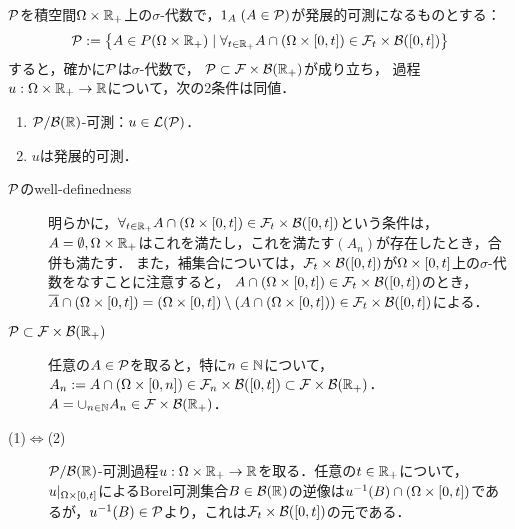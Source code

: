 \documentclass[uplatex,dvipdfmx]{jsreport}
\begin{document}
\begin{lemma}[発展的可測性の特徴付け]
    $\P$を積空間$\Om\times\R_+$上の$\sigma$-代数で，$1_A\;(A\in\P)$が発展的可測になるものとする：
    \[\P:=\Brace{A\in P(\Om\times\R_+)\mid\forall_{t\in\R_+} A\cap(\Om\times[0,t])\in\F_t\times\B([0,t])}\]
    すると，確かに$\P$は$\sigma$-代数で，
    $\P\subset\F\times\B(\R_+)$が成り立ち，
    過程$u:\Om\times\R_+\to\R$について，次の2条件は同値．
    \begin{enumerate}
        \item $\P/\B(\R)$-可測：$u\in\L(\P)$．
        \item $u$は発展的可測．
    \end{enumerate}
\end{lemma}
\begin{Proof}\mbox{}
    \begin{description}
        \item[$\P$のwell-definedness] 明らかに，$\forall_{t\in\R_+} A\cap(\Om\times[0,t])\in\F_t\times\B([0,t])$という条件は，$A=\emptyset,\Om\times\R_+$はこれを満たし，これを満たす$(A_n)$が存在したとき，合併も満たす．
        また，補集合については，$\F_t\times\B([0,t])$が$\Om\times[0,t]$上の$\sigma$-代数をなすことに注意すると，
        $A\cap(\Om\times[0,t])\in\F_t\times\B([0,t])$のとき，
        $\o{A}\cap(\Om\times[0,t])=(\Om\times[0,t])\setminus (A\cap(\Om\times[0,t]))\in\F_t\times\B([0,t])$による．
        \item[$\P\subset\F\times\B(\R_+)$] 
        任意の$A\in\P$を取ると，特に$n\in\N$について，$A_n:=A\cap(\Om\times[0,n])\in\F_n\times\B([0,t])\subset\F\times\B(\R_+)$．
        $A=\cup_{n\in\N}A_n\in\F\times\B(\R_+)$．
        \item[(1)$\Leftrightarrow$(2)] $\P/\B(\R)$-可測過程$u:\Om\times\R_+\to\R$を取る．任意の$t\in\R_+$について，$u|_{\Om\times[0,t]}$によるBorel可測集合$B\in\B(\R)$の逆像は$u^{-1}(B)\cap(\Om\times[0,t])$であるが，$u^{-1}(B)\in\P$より，これは$\F_t\times\B([0,t])$の元である．
    \end{description}
\end{Proof}
\end{document}
